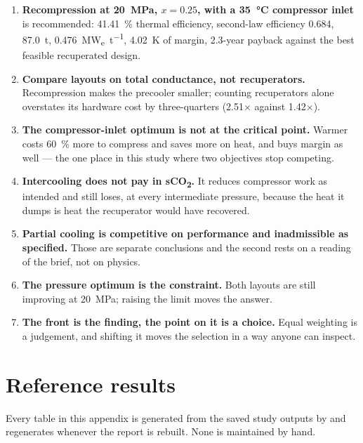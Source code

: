 \begin{enumerate}\itemsep4pt
\item \textbf{Recompression at \SI{20}{\mega\pascal}, $x = 0.25$, with a
      \SI{35}{\celsius} compressor inlet} is recommended:
      \SI{41.41}{\percent} thermal efficiency, second-law efficiency
      \num{0.684}, \SI{87.0}{\tonne},
      \SI{0.476}{\mega\watt_e\per\tonne}, \SI{4.02}{\kelvin} of margin,
      \num{2.3}-year payback against the best feasible recuperated
      design.
\item \textbf{Compare layouts on total conductance, not recuperators.}
      Recompression makes the precooler smaller; counting recuperators
      alone overstates its hardware cost by three-quarters
      (\num{2.51}$\times$ against \num{1.42}$\times$).
\item \textbf{The compressor-inlet optimum is not at the critical
      point.} Warmer costs \SI{60}{\percent} more to compress and saves
      more on heat, and buys margin as well --- the one place in this
      study where two objectives stop competing.
\item \textbf{Intercooling does not pay in sCO\textsubscript{2}.} It
      reduces compressor work as intended and still loses, at every
      intermediate pressure, because the heat it dumps is heat the
      recuperator would have recovered.
\item \textbf{Partial cooling is competitive on performance and
      inadmissible as specified.} Those are separate conclusions and
      the second rests on a reading of the brief, not on physics.
\item \textbf{The pressure optimum is the constraint.} Both layouts are
      still improving at \SI{20}{\mega\pascal}; raising the limit moves
      the answer.
\item \textbf{The front is the finding, the point on it is a choice.}
      Equal weighting is a judgement, and shifting it moves the
      selection in a way anyone can inspect.
\end{enumerate}

\appendix
\section{Reference results}
\label{r:app:results}

Every table in this appendix is generated from the saved study outputs
by  and regenerates whenever the
report is rebuilt. None is maintained by hand.


